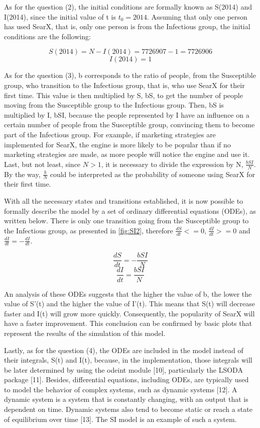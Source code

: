 \documentclass{article}
\begin{document}
As for the question (2), the initial conditions are formally known as S(2014) and I(2014), since the initial value of t is $t_0 = 2014$. Assuming that only one person has used SearX, that is, only one person is from the Infectious group, the initial conditions are the following:

\[ S(2014) = N - I(2014) = 7 726 907-1= 7 726 906 \]
\[ I(2014) = 1 \]

As for the question (3), b corresponds to the ratio of people, from the Susceptible group, who transition to the Infectious group, that is, who use SearX for their first time. This value is then multiplied by S, bS, to get the number of people moving from the Susceptible group to the Infectious group. Then, bS is multiplied by I, bSI, because the people represented by I have an influence on a certain number of people from the Susceptible group, convincing them to become part of the Infectious group. For example, if marketing strategies are implemented for SearX, the engine is more likely to be popular than if no marketing strategies are made, as more people will notice the engine and use it. Last, but not least, since $N>1$, it is necessary to divide the expression by N, $\frac{bSI}{N}$. By the way, $\frac{b}{N}$ could be interpreted as the probability of someone using SearX for their first time.

With all the necessary states and transitions established, it is now possible to formally describe the model by a set of ordinary differential equations (ODEs), as written below. There is only one transition going from the Susceptible group to the Infectious group, as presented in \autoref{fig:SI2}, therefore $\frac{dS}{dt} <= 0$, $\frac{dI}{dt} >= 0$ and $\frac{dI}{dt} = - \frac{dI}{dt}$.

\[ \frac{dS}{dt} = - \frac{bSI}{N} \]
\[ \frac{dI}{dt} = \frac{bSI}{N}  \]

An analysis of these ODEs suggests that the higher the value of b, the lower the value of S’(t) and the higher the value of I’(t). This means that S(t) will decrease faster and I(t) will grow more quickly. Consequently, the popularity of SearX will have a faster improvement. This conclusion can be confirmed by basic plots that represent the results of the simulation of this model.

Lastly, as for the question (4), the ODEs are included in the model instead of their integrals, S(t) and I(t), because, in the implementation, those integrals will be later determined by using the odeint module [10], particularly the LSODA package [11]. Besides, differential equations, including ODEs, are typically used to model the behavior of complex systems, such as dynamic systems [12]. A dynamic system is a system that is constantly changing, with an output that is dependent on time. Dynamic systems also tend to become static or reach a state of equilibrium over time [13]. The SI model is an example of such a system.
\end{document}
